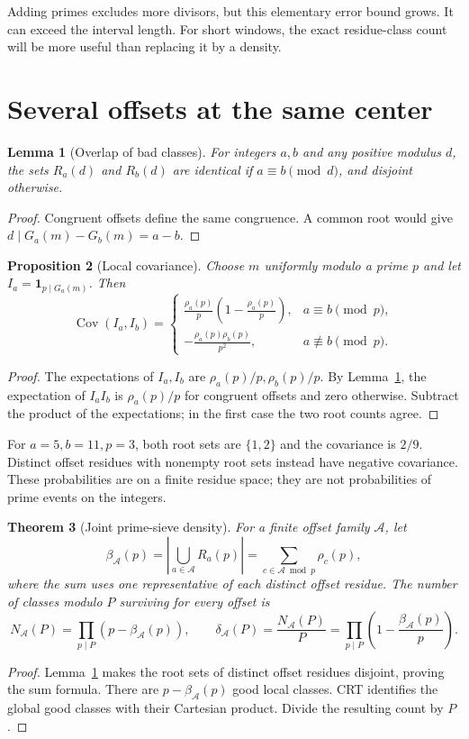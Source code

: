 \documentclass[11pt]{article}
\newtheorem{theorem}{Theorem}[section]
\newtheorem{proposition}[theorem]{Proposition}
\newtheorem{lemma}[theorem]{Lemma}
\theoremstyle{definition}
\theoremstyle{remark}
\newcommand{\ind}{\mathbf 1}
\begin{document}
Adding primes excludes more divisors, but this elementary error bound
grows. It can exceed the interval length. For short windows, the exact
residue-class count will be more useful than replacing it by a density.

\section{Several offsets at the same center}
\begin{lemma}[Overlap of bad classes]\label{lem:overlap}
For integers $a,b$ and any positive modulus $d$, the sets $R_a(d)$
and $R_b(d)$ are identical if $a\equiv b\pmod d$, and disjoint otherwise.
\end{lemma}
\begin{proof}
Congruent offsets define the same congruence. A common root would
give $d\mid G_a(m)-G_b(m)=a-b$.
\end{proof}

\begin{proposition}[Local covariance]\label{prop:covariance}
Choose $m$ uniformly modulo a prime $p$ and let $I_a=\ind_{p\mid G_a(m)}$.
Then
\[
 \operatorname{Cov}(I_a,I_b)=
 \begin{cases}
 \displaystyle\frac{\rho_a(p)}p\left(1-\frac{\rho_a(p)}p\right),
    &a\equiv b\pmod p,\\[6pt]
 \displaystyle-\frac{\rho_a(p)\rho_b(p)}{p^2},&a\not\equiv b\pmod p.
 \end{cases}
\]
\end{proposition}
\begin{proof}
The expectations of $I_a,I_b$ are $\rho_a(p)/p,\rho_b(p)/p$.
By Lemma~\ref{lem:overlap}, the expectation of $I_aI_b$ is
$\rho_a(p)/p$ for congruent offsets and zero otherwise.
Subtract the product of the expectations; in the first case the
two root counts agree.
\end{proof}

For $a=5,b=11,p=3$, both root sets are $\{1,2\}$ and the covariance
is $2/9$. Distinct offset residues with nonempty root sets instead have
negative covariance. These probabilities are on a finite residue
space; they are not probabilities of prime events on the integers.

\begin{theorem}[Joint prime-sieve density]\label{thm:joint}
For a finite offset family $\mathcal A$, let
\[
 \beta_{\mathcal A}(p)=\left|\bigcup_{a\in\mathcal A}R_a(p)\right|
 =\sum_{c\in\mathcal A\bmod p}\rho_c(p),
\]
where the sum uses one representative of each distinct offset residue.
The number of classes modulo $P$ surviving for every offset is
\[
 N_{\mathcal A}(P)=\prod_{p\mid P}(p-\beta_{\mathcal A}(p)),
 \qquad
 \delta_{\mathcal A}(P)=\frac{N_{\mathcal A}(P)}P
 =\prod_{p\mid P}\left(1-\frac{\beta_{\mathcal A}(p)}p\right).
\]
\end{theorem}
\begin{proof}
Lemma~\ref{lem:overlap} makes the root sets of distinct offset residues
disjoint, proving the sum formula. There are $p-\beta_{\mathcal A}(p)$
good local classes. CRT identifies the global good classes with their
Cartesian product. Divide the resulting count by $P$.
\end{proof}
\end{document}
